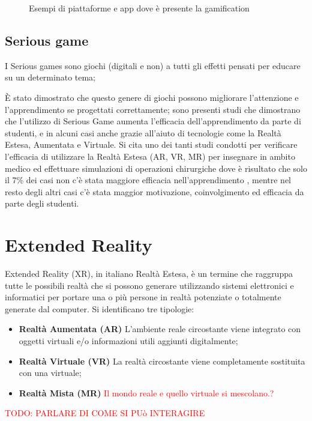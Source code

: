 \begin{figure}
{        \label{fig:waze-level}
    }
    \caption{Esempi di piattaforme e app dove è presente la gamification} 
    \label{fig:gamification-example}
\end{figure}

\subsection{Serious game}
I Serious games sono giochi (digitali e non) a tutti gli effetti pensati per educare su un determinato tema;

È stato dimostrato che questo genere di giochi possono migliorare l'attenzione e l'apprendimento se progettati correttamente;
sono presenti studi che dimostrano che l'utilizzo di Serious Game aumenta l'efficacia dell'apprendimento da parte di studenti, e in alcuni casi anche grazie all'aiuto di tecnologie come la Realtà Estesa, Aumentata e Virtuale.
Si cita uno dei tanti studi condotti per verificare l'efficacia di utilizzare la Realtà Estesa (AR, VR, MR) per insegnare in ambito medico ed effettuare simulazioni di operazioni chirurgiche dove è risultato che solo il 7\% dei casi non c'è stata maggiore efficacia nell'apprendimento \cite{HMDmedicalSeriousgame}, mentre nel resto degli altri casi c'è stata maggior motivazione, coinvolgimento ed efficacia da parte degli studenti.

%
\section{Extended Reality}
Extended Reality (XR), in italiano Realtà Estesa, è un termine che raggruppa tutte le possibili realtà che si possono generare utilizzando sistemi elettronici e informatici per portare una o più persone in realtà potenziate o totalmente generate dal computer.
Si identificano tre tipologie:

\begin{itemize}
    \item \textbf{Realtà Aumentata (AR)} L'ambiente reale circostante viene integrato con oggetti virtuali e/o informazioni utili aggiunti digitalmente;
    \item \textbf{Realtà Virtuale (VR)} La realtà circostante viene completamente sostituita con una virtuale;
    \item \textbf{Realtà Mista (MR)} \textcolor{red}{Il mondo reale e quello virtuale si mescolano.?}
\end{itemize}

\textcolor{red}{TODO: PARLARE DI COME SI PUò INTERAGIRE}

